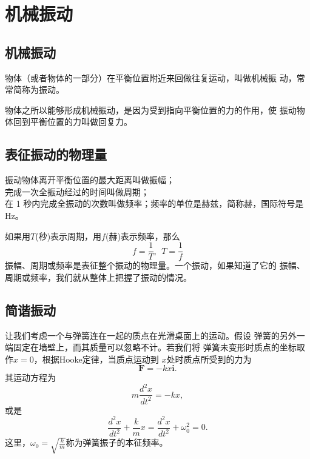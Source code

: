 \section{机械振动}
\subsection{机械振动}
\begin{definition}
    物体（或者物体的一部分）在平衡位置附近来回做往复运动，叫做机械振
    动，常常简称为振动。
\end{definition}

物体之所以能够形成机械振动，是因为受到指向平衡位置的力的作用，使
振动物体回到平衡位置的力叫做回复力。
\subsection{表征振动的物理量}
\begin{definition}
    振动物体离开平衡位置的最大距离叫做振幅；\\
    完成一次全振动经过的时间叫做周期；\\
    在 1 秒内完成全振动的次数叫做频率；频率的单位是赫兹，简称赫，国际符号是 Hz。
\end{definition}

如果用$T$(秒)表示周期，用$f$(赫)表示频率，那么
\begin{equation}
    f=\frac{1}{T},~~T=\frac{1}{f}
\end{equation}
振幅、周期或频率是表征整个振动的物理量。一个振动，如果知道了它的
振幅、周期或频率，我们就从整体上把握了振动的情况。
\subsection{简谐振动}
让我们考虑一个与弹簧连在一起的质点在光滑桌面上的运动。假设 
弹簧的另外一端固定在墙壁上，而其质量可以忽略不计。若我们将 
弹簧未变形时质点的坐标取作$x=0$，根据Hooke定律，当质点运动到
$x$处时质点所受到的力为
\begin{equation}
    \boldsymbol{F}=-kx\boldsymbol{i}.
\end{equation}
其运动方程为
\begin{equation}
    m\frac{d^2x}{dt^2}=-kx,
\end{equation}
或是
\begin{equation}
    \frac{d^2x}{dt^2}+\frac{k}{m}x=
    \frac{d^2x}{dt^2}+\omega_0^2=0.
\end{equation}
这里，$\omega_0=\sqrt{\frac{k}{m}}$称为弹簧振子的本征频率。

